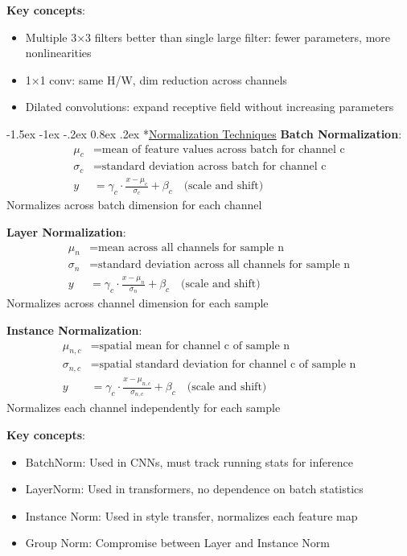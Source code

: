 \documentclass{article}
\makeatletter
\renewcommand\section{\@startsection{section}{1}{\z@}%
                                  {-1.5ex \@plus -1ex \@minus -.2ex}%
                                  {0.8ex \@plus.2ex}%
                                  {\normalfont\small\bfseries}}
\makeatother
\begin{document}
\begin{multicols}{3}
\textbf{Key concepts}:
\begin{itemize}
\item Multiple 3×3 filters better than single large filter: fewer parameters, more nonlinearities
\item 1×1 conv: same H/W, dim reduction across channels
\item Dilated convolutions: expand receptive field without increasing parameters
\end{itemize}

\section*{\underline{Normalization Techniques}}
\textbf{Batch Normalization}:
\begin{align*}
\mu_c &= \text{mean of feature values across batch for channel c}\\
\sigma_c &= \text{standard deviation across batch for channel c}\\
y &= \gamma_c \cdot \frac{x - \mu_c}{\sigma_c} + \beta_c \quad \text{(scale and shift)}
\end{align*}
Normalizes across batch dimension for each channel

\textbf{Layer Normalization}:
\begin{align*}
\mu_n &= \text{mean across all channels for sample n}\\
\sigma_n &= \text{standard deviation across all channels for sample n}\\
y &= \gamma_c \cdot \frac{x - \mu_n}{\sigma_n} + \beta_c \quad \text{(scale and shift)}
\end{align*}
Normalizes across channel dimension for each sample

\textbf{Instance Normalization}:
\begin{align*}
\mu_{n,c} &= \text{spatial mean for channel c of sample n}\\
\sigma_{n,c} &= \text{spatial standard deviation for channel c of sample n}\\
y &= \gamma_c \cdot \frac{x - \mu_{n,c}}{\sigma_{n,c}} + \beta_c \quad \text{(scale and shift)}
\end{align*}
Normalizes each channel independently for each sample

\textbf{Key concepts}:
\begin{itemize}
\item BatchNorm: Used in CNNs, must track running stats for inference
\item LayerNorm: Used in transformers, no dependence on batch statistics
\item Instance Norm: Used in style transfer, normalizes each feature map
\item Group Norm: Compromise between Layer and Instance Norm
\end{itemize}


\end{multicols}
\end{document}
